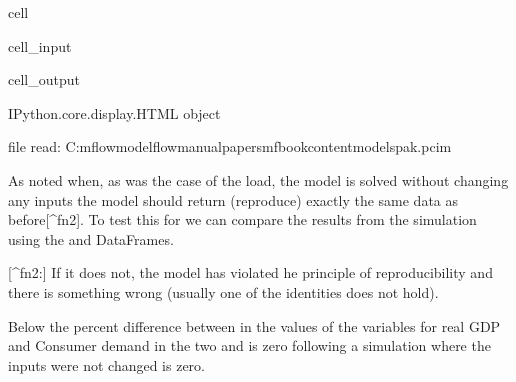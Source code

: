 \documentclass[letterpaper,10pt,english]{jupyterBook}
\begin{document}
\begin{sphinxuseclass}{cell}
\begin{sphinxVerbatimInput}
\begin{sphinxuseclass}{cell_input}
\end{sphinxuseclass}\end{sphinxVerbatimInput}
\begin{sphinxVerbatimOutput}

\begin{sphinxuseclass}{cell_output}
\begin{sphinxVerbatim}[commandchars=\\\{\}]
\PYGZlt{}IPython.core.display.HTML object\PYGZgt{}
\end{sphinxVerbatim}

\begin{sphinxVerbatim}[commandchars=\\\{\}]
file read:  C:\PYGZbs{}mflow\PYGZbs{}modelflow\PYGZhy{}manual\PYGZbs{}papers\PYGZbs{}mfbook\PYGZbs{}content\PYGZbs{}models\PYGZbs{}pak.pcim
\end{sphinxVerbatim}

\end{sphinxuseclass}\end{sphinxVerbatimOutput}

\end{sphinxuseclass}
\sphinxAtStartPar
As noted when, as was the case of the load, the model is solved without changing any inputs the model should return (reproduce) exactly the same data as before{[}\textasciicircum{}fn2{]}.  To test this for  we can compare the results from the simulation using the  and  DataFrames.

\sphinxAtStartPar
{[}\textasciicircum{}fn2:{]} If it does not, the model has violated he principle of reproducibility and there is something wrong (usually one of the identities does not hold).

\sphinxAtStartPar
Below the percent difference between in the values of the variables for real GDP and Consumer demand  in the two   and  is zero following a simulation where the inputs were not changed is zero.
\end{document}
